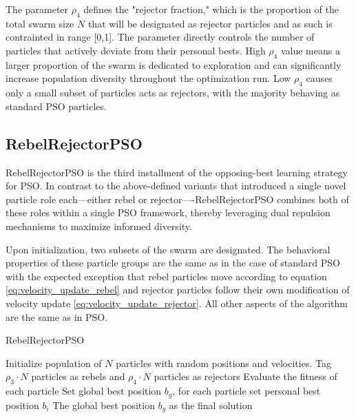 {The parameter $\rho_4$ defines the "rejector fraction," which is the proportion of the total swarm size $N$ that will be designated as rejector particles and as such is contrainted in range [0,1]. The parameter directly controls the number of particles that actively deviate from their personal bests. High $\rho_4$ value means a larger proportion of the swarm is dedicated to exploration and can significantly increase population diversity throughout the optimization run. Low $\rho_4$ causes only a small subset of particles acts as rejectors, with the majority behaving as standard PSO particles.

\subsection*{RebelRejectorPSO}

RebelRejectorPSO is the third installment of the opposing-best learning strategy for PSO. 
In contrast to the above-defined variants that introduced a single novel particle role each---either rebel or rejector----RebelRejectorPSO combines both of these roles within a single PSO framework, thereby leveraging dual repulsion mechanisms to maximize informed diversity. 

Upon initialization, two subsets of the swarm are designated.
The behavioral properties of these particle groups are the same as in the case of standard PSO with the expected exception that rebel particles move according to equation \eqref{eq:velocity_update_rebel} and rejector particles follow their own modification of velocity update \eqref{eq:velocity_update_rejector}. All other aspects of the algorithm are the same as in PSO.

\vspace{.935em}
\begin{algorithm}[H]
\caption{RebelRejectorPSO}\label{alg:rebel_rejector}
Initialize population of \(N\) particles with random positions and velocities. Tag \(\rho_3 \cdot N\) particles as rebels and  \(\rho_4 \cdot N\) particles as rejectors\;
Evaluate the fitness of each particle\;
Set global best position \(b_g\), for each particle set personal best position \(b_i\)\;
\Return The global best position \(b_g\) as the final solution\;
\end{algorithm}
\vspace{.935em}


}
